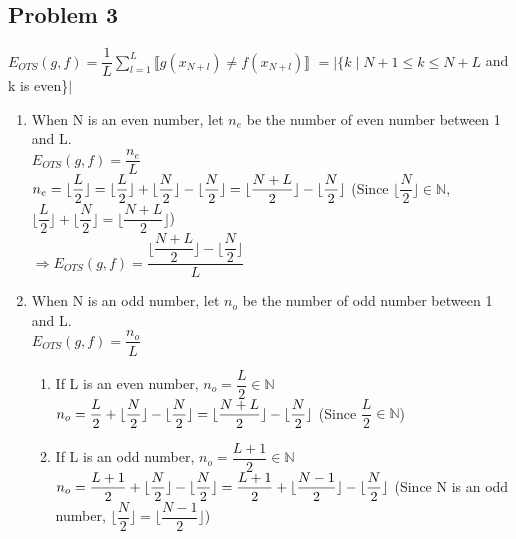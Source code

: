 \documentclass[12pt, a4paper]{article}
\begin{document}
\begin{CJK}{UTF8}{bkai}
	\linespread{1.5}
	\fontsize{12pt}{20pt} \selectfont
	\newpage
	\section*{Problem 3}
		$E_{OTS}(g,f) = \dfrac{1}{L} \sum\limits_{l=1}^{L} \llbracket g(x_{N+l}) \neq f(x_{N+l})\rrbracket$
		$= |\{k \mid N+1\leq k\leq N+L$ and k is even\}$|$ \par
		\begin{enumerate}
			\item
				When N is an even number, let $n_e$ be the number of even number between 1 and L. \\
				$E_{OTS}(g,f) = \dfrac{n_e}{L}$ \\
				$n_e = \lfloor \dfrac{L}{2}\rfloor \\
				 	 = \lfloor \dfrac{L}{2}\rfloor + \lfloor \dfrac{N}{2}\rfloor - \lfloor \dfrac{N}{2}\rfloor \\
					 = \lfloor \dfrac{N+L}{2}\rfloor - \lfloor \dfrac{N}{2}\rfloor$  \hspace{3em}
					(Since $\lfloor \dfrac{N}{2}\rfloor \in \mathbb{N}$, 
				$\lfloor \dfrac{L}{2}\rfloor + \lfloor \dfrac{N}{2}\rfloor = \lfloor \dfrac{N+L}{2}\rfloor$) \\				
				$\Rightarrow E_{OTS}(g,f) = \dfrac{ \lfloor \dfrac{N+L}{2}\rfloor - \lfloor \dfrac{N}{2}\rfloor }{L}$
			\item
				When N is an odd number, let $n_o$ be the number of odd number between 1 and L. \\
				$E_{OTS}(g,f) = \dfrac{n_o}{L}$
				\begin{enumerate}
				\item
					If L is an even number, $n_o = \dfrac{L}{2} \in \mathbb{N}$ \\
					$n_o = \dfrac{L}{2} + \lfloor \dfrac{N}{2}\rfloor - \lfloor \dfrac{N}{2}\rfloor \\
					 = \lfloor \dfrac{N+L}{2}\rfloor - \lfloor \dfrac{N}{2}\rfloor$  \hspace{3em}
					(Since $\dfrac{L}{2} \in \mathbb{N}$)
				\item
					If L is an odd number, $n_o = \dfrac{L+1}{2} \in \mathbb{N}$ \\
					$n_o = \dfrac{L+1}{2} + \lfloor \dfrac{N}{2}\rfloor - \lfloor \dfrac{N}{2}\rfloor \\
					= \dfrac{L+1}{2} + \lfloor \dfrac{N-1}{2}\rfloor - \lfloor \dfrac{N}{2}\rfloor$
					\hspace{3em} (Since N is an odd number, $\lfloor \dfrac{N}{2}\rfloor  = \lfloor \dfrac{N-1}{2}\rfloor $) \\

\end{enumerate}
\end{enumerate}
\end{CJK}
\end{document}
